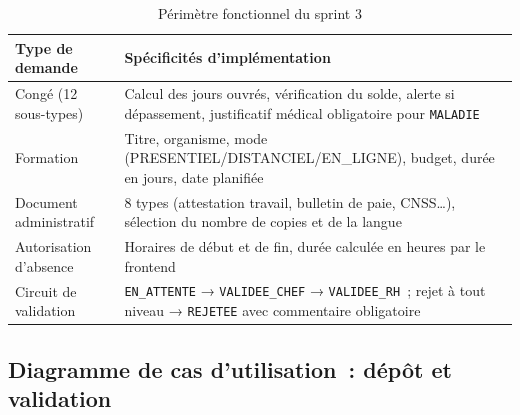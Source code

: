 \begin{table}[H]
\centering
\caption{Périmètre fonctionnel du sprint 3}
\label{tab:s3}
\begin{tabularx}{\textwidth}{|l|L|}
\hline
{}\textbf{Type de demande} & \textbf{Spécificités d'implémentation} \\\hline
{}
Congé (12 sous-types) & Calcul des jours ouvrés, vérification du solde,
  alerte si dépassement, justificatif médical obligatoire pour \texttt{MALADIE} \\\hline
Formation & Titre, organisme, mode (PRESENTIEL/DISTANCIEL/EN\_LIGNE), budget,
  durée en jours, date planifiée \\\hline
{}
Document administratif & 8 types (attestation travail, bulletin de paie, CNSS…),
  sélection du nombre de copies et de la langue \\\hline
Autorisation d'absence & Horaires de début et de fin, durée calculée en heures
  par le frontend \\\hline
{}
Circuit de validation & \texttt{EN\_ATTENTE} → \texttt{VALIDEE\_CHEF} → \texttt{VALIDEE\_RH}~;
  rejet à tout niveau → \texttt{REJETEE} avec commentaire obligatoire \\\hline
\end{tabularx}
\end{table}

\subsection{Diagramme de cas d'utilisation~: dépôt et validation}

